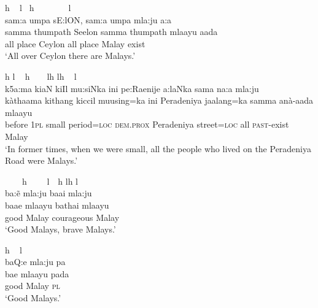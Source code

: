 % 

\el{}

\ea \label{K051222nar04.27}
\gllll \hspace{0.7cm}h ~      \hspace{0.7cm}l     ~h         ~                    ~   ~~~~l\\
 sam:a \dentt umpa\dentt{}  sE:lON, sam:a \dentt umpa\dentt{} \s mla:ju a:\dz a\\
 samma thumpath Seelon samma thumpath mlaayu aada\\
 all place Ceylon all place Malay exist\\
`All over Ceylon there are Malays.'
\z


\ea \label{K051222nar04.28}
\gllll \hspace{1cm}h l     ~              \hspace{1.2cm}h ~  ~            \hspace{1cm}lh l\hspace{1cm}h ~   \hspace{0.9cm}l \\
 k5\dentt a:ma ki\dentt aN kiIl mu:siNka ini pe:Ra\dentd enije  \J a:laNka sama na:\dz a \s mla:ju\\
 kàthaama kithang kiccil muusing=ka ini Peradeniya jaalang=ka samma anà-aada mlaayu\\
 before \textsc{1pl} small period=\textsc{loc} \textsc{dem.prox} Peradeniya street=\textsc{loc} all \textsc{past}-exist Malay\\
`In former times, when we were small, all the people who lived on the Peradeniya Road were Malays.'
\z


\ea \label{K051222nar04.29}
\gllll ~~~~h  ~~~~l~~h l\hspace{0.5cm}h \hspace{0.9cm}l\\
 ba:\~e \s mla:ju ba\dentt ai \s mla:ju \\
 baae mlaayu bathai mlaayu\\
 good Malay courageous Malay\\
`Good Malays, brave Malays.'
\z


\ea \label{K051222nar04.30}
\gllll \hspace{0.7cm}h ~ \hspace{0.6cm}l \\
 ba\super Q:e \s mla:ju pa\\
 bae mlaayu pada\\
 good Malay \textsc{pl} \\
`Good Malays.'
\z


